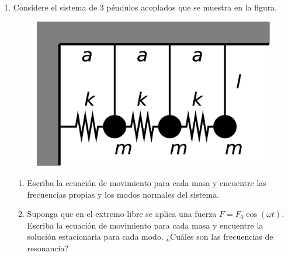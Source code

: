 \documentclass[11pt,spanish]{article}
\begin{document}
\begin{enumerate}

    \item Considere el sistema de 3 péndulos acoplados que se muestra en la
    figura.

    \begin{figure}[H]
        \centering{}\includegraphics[clip,scale=0.25]{figs/ej1-14}
    \end{figure}

    \begin{enumerate}
        \item Escriba la ecuación de movimiento para cada masa y encuentre las
        frecuencias propias y los modos normales del sistema.

        \item Suponga que en el extremo libre se aplica una fuerza
        $F=F_{0}\cos(\omega t)$. Escriba la ecuación de movimiento para cada
        masa y encuentre la solución estacionaria para cada modo. ¿Cuáles son
        las frecuencias de resonancia?
    \end{enumerate}

\end{enumerate}
\end{document}
